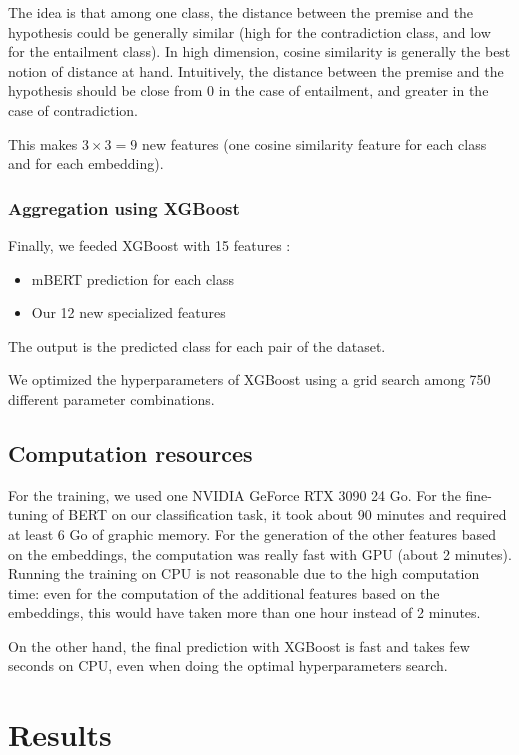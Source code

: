 \documentclass[final]{cvpr}
\begin{document}
The idea is that among one class, the distance between the premise and the hypothesis could be generally similar (high for the contradiction class, and low for the entailment class). In high dimension, cosine similarity is generally the best notion of distance at hand. Intuitively, the distance between the premise and the hypothesis should be close from 0 in the case of entailment, and greater in the case of contradiction.

This makes $3 \times 3 = 9$ new features (one cosine similarity feature for each class and for each embedding).

\subsubsection{Aggregation using XGBoost}

Finally, we feeded XGBoost with 15 features : 

\begin{itemize}
    \item mBERT prediction for each class
    \item Our 12 new specialized features
\end{itemize}

The output is the predicted class for each pair of the dataset.

We optimized the hyperparameters of XGBoost using a grid search among 750 different parameter combinations.

\subsection{Computation resources}

For the training, we used one NVIDIA GeForce RTX 3090 24 Go. For the fine-tuning of BERT on our classification task, it took about 90 minutes and required at least 6 Go of graphic memory. For the generation of the other features based on the embeddings, the computation was really fast with GPU (about 2 minutes). Running the training on CPU is not reasonable due to the high computation time: even for the computation of the additional features based on the embeddings, this would have taken more than one hour instead of 2 minutes.

On the other hand, the final prediction with XGBoost is fast and takes few seconds on CPU, even when doing the optimal hyperparameters search.

\section{Results}
\end{document}
